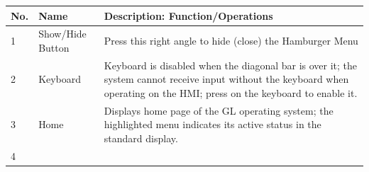 \begin{longtable}[]{@{}lll@{}}
\toprule
\begin{minipage}[b]{0.04\columnwidth}\raggedright
No.\strut
\end{minipage} & \begin{minipage}[b]{0.23\columnwidth}\raggedright
Name\strut
\end{minipage} & \begin{minipage}[b]{0.65\columnwidth}\raggedright
Description: Function/Operations\strut
\end{minipage}\tabularnewline
\midrule
\endhead
\begin{minipage}[t]{0.04\columnwidth}\raggedright
1\strut
\end{minipage} & \begin{minipage}[t]{0.23\columnwidth}\raggedright
Show/Hide Button\strut
\end{minipage} & \begin{minipage}[t]{0.65\columnwidth}\raggedright
Press this right angle to hide (close) the Hamburger Menu\strut
\end{minipage}\tabularnewline
\begin{minipage}[t]{0.04\columnwidth}\raggedright
2\strut
\end{minipage} & \begin{minipage}[t]{0.23\columnwidth}\raggedright
Keyboard\strut
\end{minipage} & \begin{minipage}[t]{0.65\columnwidth}\raggedright
Keyboard is disabled when the diagonal bar is over it; the system cannot
receive input without the keyboard when operating on the HMI; press on
the keyboard to enable it.\strut
\end{minipage}\tabularnewline
\begin{minipage}[t]{0.04\columnwidth}\raggedright
3\strut
\end{minipage} & \begin{minipage}[t]{0.23\columnwidth}\raggedright
Home\strut
\end{minipage} & \begin{minipage}[t]{0.65\columnwidth}\raggedright
Displays home page of the GL operating system; the highlighted menu
indicates its active status in the standard display.\strut
\end{minipage}\tabularnewline
\begin{minipage}[t]{0.04\columnwidth}\raggedright
4\strut
\end{minipage} & \begin{minipage}[t]{0.23\columnwidth}\raggedright

\end{minipage}
\end{longtable}
